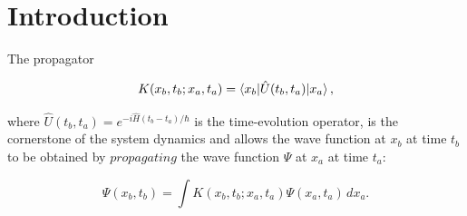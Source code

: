 \documentclass[11pt,a4paper,twoside,pdf]{article}
\numberwithin{equation}{section}
\begin{document}
\begin{abstract}
\normalsize

We reproduce the results of Creutz and Freedman \cite{creutz1981statistical}, where the Monte Carlo method is applied to the path integral in Euclidean (imaginary) time to study one-dimensional quantum mechanics problems. After a Wick rotation, the oscillatory weight $e^{iS/\hbar}$ of the Feynman formulation becomes a real positive weight $e^{-S_E/\hbar}$ formally identical to the Boltzmann distribution of a classical statistical system, enabling path configurations to be sampled via the $M(RT)^2$ (Metropolis) algorithm. We analyse the harmonic oscillator (method validation), the anharmonic oscillator, the double well and its instanton content, as well as the system response to an external source and the construction of the renormalised effective potential. Simulations are performed on a temporal lattice of $N=200, 400$ sites with periodic boundary conditions, or antiperiodic conditions in the case of kinks.

\end{abstract}


\vspace{1mm}


\newpage
\tableofcontents



\pagestyle{fancy}
\fancyhead[RO,LE]{\leftmark}
\fancyhead[LO,RE]{\thepage}
\fancyfoot{}


\newpage


\section{Introduction}

The propagator

\begin{equation}
    K(x_b, t_b; x_a, t_a) = \braket{x_b | \hat{U}(t_b, t_a) | x_a},
    \label{Kdef}
\end{equation}

where $\hat{U}(t_b, t_a) = e^{-i\hat{H}(t_b - t_a)/\hbar}$ is the time-evolution operator, is the cornerstone of the system dynamics and allows the wave function at $x_b$ at time $t_b$ to be obtained by $propagating$ the wave function $\Psi$ at $x_a$ at time $t_a$:

\begin{equation}
    \Psi(x_b, t_b) = \int K(x_b, t_b; x_a, t_a) \Psi(x_a, t_a) \, dx_a.
\end{equation}
\end{document}
